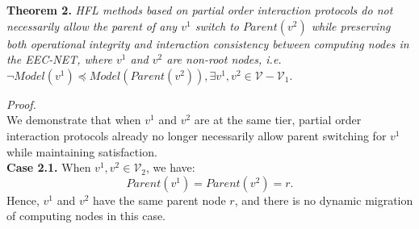 \documentclass[10pt,journal]{IEEEtran}
\begin{document}



\noindent
\textbf{Theorem 2.} \textit{HFL methods based on partial order interaction protocols do not necessarily allow the parent of any $v^1$ switch to $Parent(v^2)$ while preserving both operational integrity and interaction consistency between computing nodes in the EEC-NET, where $v^1$ and $v^2$ are non-root nodes, i.e. $\neg Model({v^1}) \preceq Model(Parent({v^2})),\exists {v^1},{v^2} \in \mathcal{V}- \mathcal{V}_1$}.

\noindent
\textit{Proof.} \\
We demonstrate that when $v^1$ and $v^2$ are at the same tier, partial order interaction protocols already no longer necessarily allow parent switching for $v^1$ while maintaining satisfaction.\\
\textbf{Case 2.1.} When ${v^1},{v^2} \in {\mathcal{V}_2}$, we have:
\begin{equation}
    Parent(v^1) = Parent(v^2) = r.
\end{equation}
Hence, $v^1$ and $v^2$ have the same parent node $r$, and there is no dynamic migration of computing nodes in this case.
\end{document}
